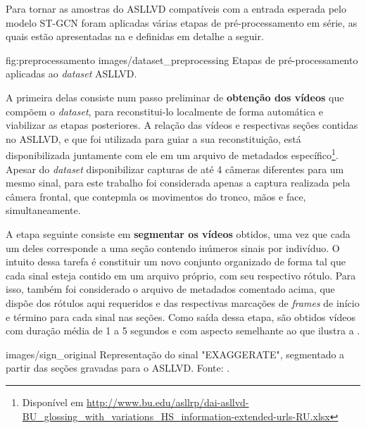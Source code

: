 Para tornar as amostras do ASLLVD compatíveis com a entrada esperada pelo modelo ST-GCN foram aplicadas várias etapas de pré-processamento em série, as quais estão apresentadas na  e definidas em detalhe a seguir.


\image
    {fig:preprocessamento}
    {images/dataset_preprocessing}
    {Etapas de pré-processamento aplicadas ao \textit{dataset} ASLLVD.}

A primeira delas consiste num passo preliminar de \textbf{obtenção dos vídeos} que compõem o \textit{dataset}, para reconstitui-lo localmente de forma automática e viabilizar as etapas posteriores. A relação das vídeos e respectivas seções contidas no ASLLVD, e que foi utilizada para guiar a sua reconstituição, está disponibilizada juntamente com ele em um arquivo de metadados específico\footnote{
    Disponível em \url{http://www.bu.edu/asllrp/dai-asllvd-BU_glossing_with_variations_HS_information-extended-urls-RU.xlsx}
}. Apesar do \textit{dataset} disponibilizar capturas de até 4 câmeras diferentes para um mesmo sinal, para este trabalho foi considerada apenas a captura realizada pela câmera frontal, que contepmla os movimentos do tronco, mãos e face, simultaneamente.

A etapa seguinte consiste em \textbf{segmentar os vídeos} obtidos, uma vez que cada um deles corresponde a uma seção contendo inúmeros sinais por indivíduo. O intuito dessa tarefa é constituir um novo conjunto organizado de forma tal que cada sinal esteja contido em um arquivo próprio, com seu respectivo rótulo. Para isso, também foi considerado o arquivo de metadados comentado acima, que dispõe dos rótulos aqui requeridos e das respectivas marcações de \textit{frames} de início e término para cada sinal nas seções. Como saída dessa etapa, são obtidos vídeos com duração média de 1 a 5 segundos e com aspecto semelhante ao que ilustra a .

    {images/sign_original}
    {Representação do sinal "EXAGGERATE", segmentado a partir das seções gravadas para o ASLLVD. Fonte: \cite{athitsos-asllvd-2008}.}


